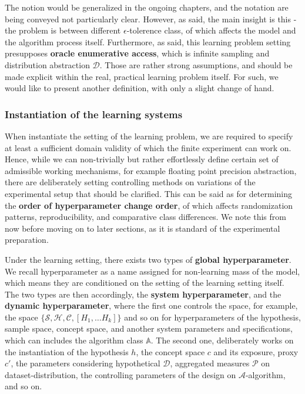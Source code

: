The notion would be generalized in the ongoing chapters, and the notation are being conveyed not particularly clear. However, as said, the main insight is this - the problem is between different $\epsilon$-tolerence class, of which affects the model and the algorithm process itself. Furthermore, as said, this learning problem setting presupposes \textbf{oracle enumerative access}, which is infinite sampling and distribution abstraction $\mathcal{D}$. Those are rather strong assumptions, and should be made explicit within the real, practical learning problem itself. For such, we would like to present another definition, with only a slight change of hand. 

\subsubsection{Instantiation of the learning systems}

When instantiate the setting of the learning problem, we are required to specify at least a sufficient domain validity of which the finite experiment can work on. Hence, while we can non-trivially but rather effortlessly define certain set of admissible working mechanisms, for example floating point precision abstraction, there are deliberately setting controlling methods on variations of the experimental setup that should be clarified. This can be said as for determining the \textbf{order of hyperparameter change order}, of which affects randomization patterns, reproducibility, and comparative class differences. We note this from now before moving on to later sections, as it is standard of the experimental preparation. 

Under the learning setting, there exists two types of \textbf{global hyperparameter}. We recall hyperparameter as a name assigned for non-learning mass of the model, which means they are conditioned on the setting of the learning setting itself. The two types are then accordingly, the \textbf{system hyperparameter}, and the \textbf{dynamic hyperparameter}, where the first one controls the space, for example, the space $\{\mathcal{S},\mathcal{H},\mathcal{C},[H_{1},\dots H_{k}]\}$ and so on for hyperparameters of the hypothesis, sample space, concept space, and another system parameters and specifications, which can includes the algorithm class $\mathbb{A}$. The second one, deliberately works on the instantiation of the hypothesis $h$, the concept space $c$ and its exposure, proxy $c'$, the parameters considering hypothetical $\mathcal{D}$, aggregated measures $\mathcal{P}$ on dataset-distribution, the controlling parameters of the design on $\mathcal{A}$-algorithm, and so on. 

